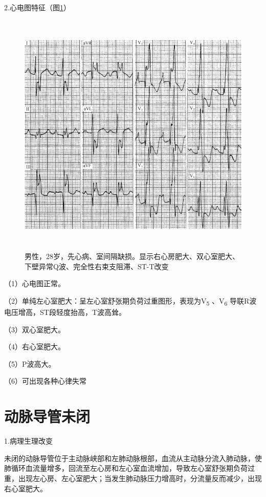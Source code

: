2.心电图特征（图\ref{fig41-4}）

\begin{figure}[!htbp]
 \centering
 \includegraphics[width=5.38542in,height=4.65625in]{./images/Image00686.jpg}
 \captionsetup{justification=centering}
 \caption{男性，28岁，先心病、室间隔缺损。显示右心房肥大、双心室肥大、下壁异常Q波、完全性右束支阻滞、ST-T改变}
 \label{fig41-4}
  \end{figure} 

（1）心电图正常。

（2）单纯左心室肥大：呈左心室舒张期负荷过重图形，表现为V\textsubscript{5}
、V\textsubscript{6} 导联R波电压增高，ST段轻度抬高，T波高耸。

（3）双心室肥大。

（4）右心室肥大。

（5）P波高大。

（6）可出现各种心律失常

\protect\hypertarget{text00049.htmlux5cux23subid583}{}{}

\section{动脉导管未闭}

1.病理生理改变

未闭的动脉导管位于主动脉峡部和左肺动脉根部，血流从主动脉分流入肺动脉，使肺循环血流量增多，回流至左心房和左心室血流增加，导致左心室舒张期负荷过重，出现左心房、左心室肥大；当发生肺动脉压力增高时，分流量反而减少，出现右心室肥大。

